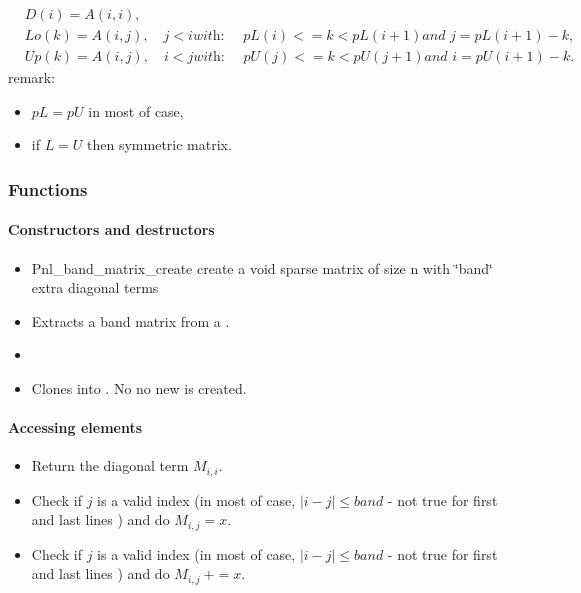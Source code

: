 \begin{align*}
  \label{eq:1}
  & D(i) = A(i, i), \nonumber \\
  & Lo(k) = A(i, j), \quad j < i \textit{with: } \quad pL(i)<= k < pL(i+1)
  \textit{and } j = pL(i+1)-k, \\
  & Up(k) =A(i, j), \quad i < j \textit{with: } \quad pU(j)<= k < pU(j+1) \textit{and } i
  = pU(i+1)-k.\nonumber
\end{align*}
remark:
\begin{itemize}
\item $ pL = pU $ in most of case, 
\item if $L = U$ then symmetric matrix.
\end{itemize}


\subsubsection{Functions}
\paragraph{Constructors and destructors}
\begin{itemize}
\item 
  \sshortdescribe Pnl_band_matrix_create create a void sparse matrix of size n with
  \char`\"{}band\char`\"{} extra diagonal terms
\item
  \sshortdescribe Extracts a band matrix from a .
\item
\item {}
  \sshortdescribe Clones  into . No no new
   is created.
\end{itemize}
\paragraph{Accessing elements}
\begin{itemize}
\item 
  \sshortdescribe Return the diagonal term $M_{i, i}$.
\item 
  \sshortdescribe Check if $j$ is a valid index (in most of case, $|i-j|\leq
  band $ - not true for first and last lines )
  and do $M_{i, j}=x$.
\item 
  \sshortdescribe Check if $j$ is a valid index (in most of case, $|i-j|\leq
  band $ - not true for first and last lines )
  and do $M_{i, j} \ +=x$.
\end{itemize}


